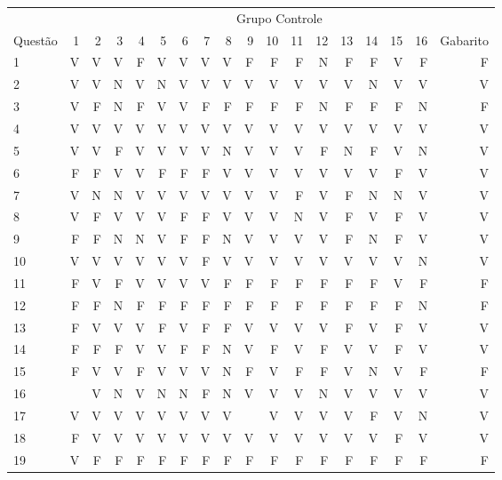 \begin{apendicesenv}
\begin{center}
	\begin{tabular}{ l r r r r r r r r r r r r r r r r r}
	\hline
	& \multicolumn{17}{c}{Grupo Controle}\\
	\cline{2 - 17} %
	\multirow[c]{-2}{*}{Questão} & 1 & 2 & 3 & 4 & 5 & 6 & 7 & 8 & 9 & 10 & 11 & 12 & 13 & 14 & 15 & 16 & Gabarito\\
	\hline
	1	&	V	&	V	&	V	&	F	&	V	&	V	&	V	&	V	&	F	&	F	&	F	&	N	&	F	&	F	&	V	&	F	&	F	\\
	2	&	V	&	V	&	N	&	V	&	N	&	V	&	V	&	V	&	V	&	V	&	V	&	V	&	V	&	N	&	V	&	V	&	V	\\
	3	&	V	&	F	&	N	&	F	&	V	&	V	&	F	&	F	&	F	&	F	&	F	&	N	&	F	&	F	&	F	&	N	&	F	\\
	4	&	V	&	V	&	V	&	V	&	V	&	V	&	V	&	V	&	V	&	V	&	V	&	V	&	V	&	V	&	V	&	V	&	V	\\
	5	&	V	&	V	&	F	&	V	&	V	&	V	&	V	&	N	&	V	&	V	&	V	&	F	&	N	&	F	&	V	&	N	&	V	\\
	6	&	F	&	F	&	V	&	V	&	F	&	F	&	F	&	V	&	V	&	V	&	V	&	V	&	V	&	V	&	F	&	V	&	V	\\
	7	&	V	&	N	&	N	&	V	&	V	&	V	&	V	&	V	&	V	&	V	&	F	&	V	&	F	&	N	&	N	&	V	&	V	\\
	8	&	V	&	F	&	V	&	V	&	V	&	F	&	F	&	V	&	V	&	V	&	N	&	V	&	F	&	V	&	F	&	V	&	V	\\
	9	&	F	&	F	&	N	&	N	&	V	&	F	&	F	&	N	&	V	&	V	&	V	&	V	&	F	&	N	&	F	&	V	&	V	\\
	10	&	V	&	V	&	V	&	V	&	V	&	V	&	F	&	V	&	V	&	V	&	V	&	V	&	V	&	V	&	V	&	N	&	V	\\
	11	&	F	&	V	&	F	&	V	&	V	&	V	&	V	&	F	&	F	&	F	&	F	&	F	&	F	&	F	&	V	&	F	&	F	\\
	12	&	F	&	F	&	N	&	F	&	F	&	F	&	F	&	F	&	F	&	F	&	F	&	F	&	F	&	F	&	F	&	N	&	F	\\
	13	&	F	&	V	&	V	&	V	&	F	&	V	&	F	&	F	&	V	&	V	&	V	&	V	&	F	&	V	&	F	&	V	&	V	\\
	14	&	F	&	F	&	F	&	V	&	V	&	F	&	F	&	N	&	V	&	F	&	V	&	F	&	V	&	V	&	F	&	V	&	V	\\
	15	&	F	&	V	&	V	&	F	&	V	&	V	&	V	&	N	&	F	&	V	&	F	&	F	&	V	&	N	&	V	&	F	&	F	\\
	16	&		&	V	&	N	&	V	&	N	&	N	&	F	&	N	&	V	&	V	&	V	&	N	&	V	&	V	&	V	&	V	&	V	\\
	17	&	V	&	V	&	V	&	V	&	V	&	V	&	V	&	V	&		&	V	&	V	&	V	&	V	&	F	&	V	&	N	&	V	\\
	18	&	F	&	V	&	V	&	V	&	V	&	V	&	V	&	V	&	V	&	V	&	V	&	V	&	V	&	V	&	F	&	V	&	V	\\
	19	&	V	&	F	&	F	&	F	&	F	&	F	&	F	&	F	&	F	&	F	&	F	&	F	&	F	&	F	&	F	&	F	&	F	\\

\end{tabular}
\end{center}
\end{apendicesenv}
